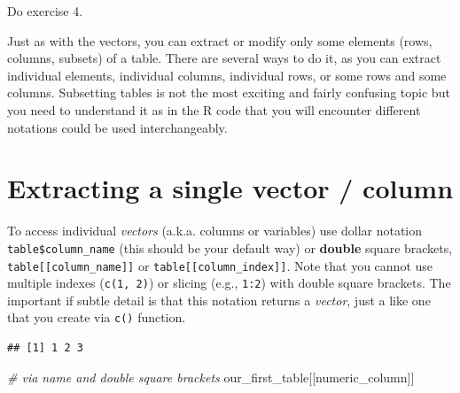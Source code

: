 \documentclass[
]{book}
\newenvironment{Shaded}{\begin{snugshade}}{\end{snugshade}}
\newcommand{\AttributeTok}[1]{\textcolor[rgb]{0.77,0.63,0.00}{#1}}
\newcommand{\CommentTok}[1]{\textcolor[rgb]{0.56,0.35,0.01}{\textit{#1}}}
\newcommand{\ConstantTok}[1]{\textcolor[rgb]{0.00,0.00,0.00}{#1}}
\newcommand{\DecValTok}[1]{\textcolor[rgb]{0.00,0.00,0.81}{#1}}
\newcommand{\FunctionTok}[1]{\textcolor[rgb]{0.00,0.00,0.00}{#1}}
\newcommand{\NormalTok}[1]{#1}
\newcommand{\OtherTok}[1]{\textcolor[rgb]{0.56,0.35,0.01}{#1}}
\newcommand{\SpecialCharTok}[1]{\textcolor[rgb]{0.00,0.00,0.00}{#1}}
\newcommand{\StringTok}[1]{\textcolor[rgb]{0.31,0.60,0.02}{#1}}
\begin{document}
Do exercise 4.

Just as with the vectors, you can extract or modify only some elements (rows, columns, subsets) of a table. There are several ways to do it, as you can extract individual elements, individual columns, individual rows, or some rows and some columns. Subsetting tables is not the most exciting and fairly confusing topic but you need to understand it as in the R code that you will encounter different notations could be used interchangeably.

\hypertarget{extracting-a-single-vector-column}{%
\section{Extracting a single vector / column}\label{extracting-a-single-vector-column}}

To access individual \emph{vectors} (a.k.a. columns or variables) use dollar notation \texttt{table\$column\_name} (this should be your default way) or \textbf{double} square brackets, \texttt{table{[}{[}column\_name{]}{]}} or \texttt{table{[}{[}column\_index{]}{]}}. Note that you cannot use multiple indexes (\texttt{c(1,\ 2)}) or slicing (e.g., \texttt{1:2}) with double square brackets. The important if subtle detail is that this notation returns a \emph{vector}, just a like one that you create via \texttt{c()} function.

\begin{Shaded}
\end{Shaded}

\begin{verbatim}
## [1] 1 2 3
\end{verbatim}

\begin{Shaded}
\begin{Highlighting}[]
\CommentTok{\# via name and double square brackets}
\NormalTok{our\_first\_table[[}\StringTok{\textquotesingle{}numeric\_column\textquotesingle{}}\NormalTok{]]}
\end{Highlighting}
\end{Shaded}
\end{document}

